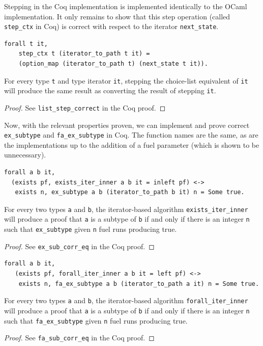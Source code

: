\documentclass[a4paper,english]{lipics-v2018}
\begin{document}
Stepping in the Coq implementation is implemented identically to the OCaml
implementation. It only remains to show that this step operation (called
\verb|step_ctx| in Coq) is correct with respect to the iterator
\verb|next_state|.

\begin{lemma}
\begin{verbatim}
forall t it,
    step_ctx t (iterator_to_path t it) =
    (option_map (iterator_to_path t) (next_state t it)).
\end{verbatim}
For every type \verb|t| and type iterator \verb|it|,
stepping the choice-list equivalent of \verb|it| will
produce the same result as converting the result of stepping
\verb|it|.
\end{lemma}
\begin{proof}
See \verb|list_step_correct| in the Coq proof.
\end{proof}

Now, with the relevant properties proven, we can implement and prove correct
\verb|ex_subtype| and \verb|fa_ex_subtype| in Coq. The function names are the
same, as are the implementations up to the addition of a fuel parameter (which
is shown to be unnecessary). 

\begin{lemma}
\begin{verbatim}
forall a b it, 
  (exists pf, exists_iter_inner a b it = inleft pf) <->
   exists n, ex_subtype a b (iterator_to_path b it) n = Some true.
\end{verbatim}
For every two types \verb|a| and \verb|b|, the iterator-based algorithm
\verb|exists_iter_inner| will produce a proof that \verb|a| is a subtype
of \verb|b| if and only if there is an integer \verb|n| such that
 \verb|ex_subtype| given \verb|n| fuel runs producing true.
\end{lemma}
\begin{proof}
See \verb|ex_sub_corr_eq| in the Coq proof.
\end{proof}

\begin{lemma}
\begin{verbatim}
forall a b it,
   (exists pf, forall_iter_inner a b it = left pf) <->
    exists n, fa_ex_subtype a b (iterator_to_path a it) n = Some true.
\end{verbatim}
For every two types \verb|a| and \verb|b|, the iterator-based algorithm
\verb|forall_iter_inner| will produce a proof that \verb|a| is a subtype
of \verb|b| if and only if there is an integer \verb|n| such that
 \verb|fa_ex_subtype| given \verb|n| fuel runs producing true.
\end{lemma}
\begin{proof}
See \verb|fa_sub_corr_eq| in the Coq proof.
\end{proof}
\end{document}
